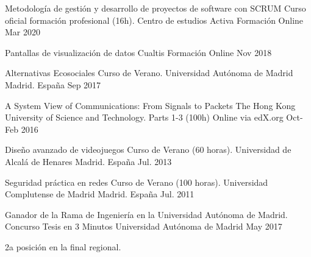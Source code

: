 \begin{cvhonors}
   \cvhonor
	{Metodología de gestión y desarrollo de proyectos de software con SCRUM} %
	{Curso oficial formación profesional (16h). Centro de estudios Activa Formación} %
	{Online} %
	{Mar 2020} %

   \cvhonor
	{Pantallas de visualización de datos} %
	{Cualtis Formación}
	{Online} %
	{Nov 2018} %

   \cvhonor
	{Alternativas Ecosociales} %
	{Curso de Verano. Universidad Autónoma de Madrid}
	{Madrid. España} %
	{Sep 2017} %

	\cvhonor
	{A System View of Communications: From Signals to Packets} %
	{The Hong Kong University of Science and Technology. Parts 1-3 (100h)}
	{Online via edX.org} %
	{Oct-Feb 2016} %
	
	\cvhonor
	{Diseño avanzado de videojuegos} %
	{Curso de Verano (60 horas). Universidad de Alcalá de Henares}
	{Madrid. España} %
	{Jul. 2013} %
	
	\cvhonor
	{Seguridad práctica en redes} %
	{Curso de Verano (100 horas). Universidad Complutense de Madrid}
	{Madrid. España} %
	{Jul. 2011} %
\end{cvhonors}

\begin{cventries}
  \cventry
    {Ganador de la Rama de Ingeniería en la Universidad Autónoma de Madrid.} %
    {Concurso Tesis en 3 Minutos} %
    {Universidad Autónoma de Madrid} %
    {May 2017} %
    {
      \begin{cvitems} %
        \item {2a posición en la final regional.}
      \end{cvitems}
    }
\end{cventries}
